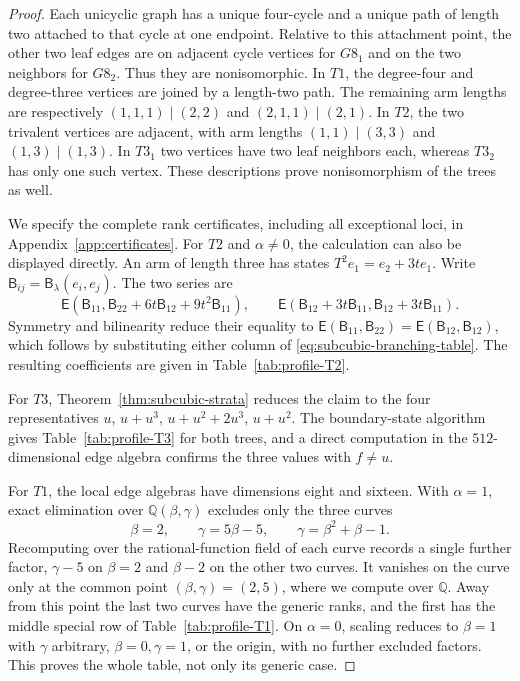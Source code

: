 \documentclass[reqno]{article}
\theoremstyle{plain} %
\theoremstyle{definition}
\theoremstyle{remark}
\numberwithin{equation}{section}
\begin{document}
\begin{proof}
Each unicyclic graph has a unique four-cycle and a unique path of
length two attached to that cycle at one endpoint. Relative to this
attachment point, the other two leaf edges are
on adjacent cycle vertices for $G8_1$ and on the two neighbors for
$G8_2$. Thus they are nonisomorphic.
In $T1$, the degree-four and degree-three vertices are joined by a
length-two path. The remaining arm lengths are respectively
$(1,1,1)\mid(2,2)$ and $(2,1,1)\mid(2,1)$.
In $T2$, the two trivalent vertices are adjacent, with arm lengths
$(1,1)\mid(3,3)$ and $(1,3)\mid(1,3)$. In $T3_1$ two vertices have two
leaf neighbors each, whereas $T3_2$ has only one such vertex. These descriptions prove
nonisomorphism of the trees as well.

We specify the complete rank certificates, including all exceptional
loci, in Appendix~\ref{app:certificates}. For $T2$ and $\alpha\ne0$,
the calculation can also be displayed directly. An arm of length three
has states $T^2e_1=e_2+3te_1$. Write
$\mathsf B_{ij}=\mathsf B_\lambda(e_i,e_j)$. The two series are
\[
\mathsf E(\mathsf B_{11},\mathsf B_{22}+6t\mathsf B_{12}
                                      +9t^2\mathsf B_{11}),
\qquad
\mathsf E(\mathsf B_{12}+3t\mathsf B_{11},
          \mathsf B_{12}+3t\mathsf B_{11}).
\]
Symmetry and bilinearity reduce their equality to
$\mathsf E(\mathsf B_{11},\mathsf B_{22})
 =\mathsf E(\mathsf B_{12},\mathsf B_{12})$,
which follows by substituting either column of
\eqref{eq:subcubic-branching-table}. The resulting coefficients are given in Table~\ref{tab:profile-T2}.

For $T3$, Theorem~\ref{thm:subcubic-strata} reduces the claim to the four
representatives $u$, $u+u^3$, $u+u^2+2u^3$, $u+u^2$. The boundary-state
algorithm gives Table~\ref{tab:profile-T3} for both trees, and a direct
computation in the $512$-dimensional edge algebra confirms the three
values with $f\ne u$.

For $T1$, the local edge algebras have dimensions eight and sixteen.
With $\alpha=1$, exact elimination over $\mathbb{Q}(\beta,\gamma)$ excludes
only the three curves
\begin{equation}\label{eq:T1-pivot-curves}
\beta=2,\qquad \gamma=5\beta-5,\qquad
\gamma=\beta^2+\beta-1.
\end{equation}
Recomputing over the rational-function field of each curve records a
single further factor, $\gamma-5$ on $\beta=2$ and $\beta-2$ on the
other two curves. It vanishes on the curve only at the common point
$(\beta,\gamma)=(2,5)$, where we compute over $\mathbb{Q}$. Away from
this point the last two curves have the generic ranks, and the first
has the middle special row of Table~\ref{tab:profile-T1}.
On $\alpha=0$, scaling reduces to $\beta=1$ with $\gamma$ arbitrary,
$\beta=0,\gamma=1$, or the origin, with no further excluded factors.
This proves the whole table, not only its generic case.


\end{proof}
\end{document}
